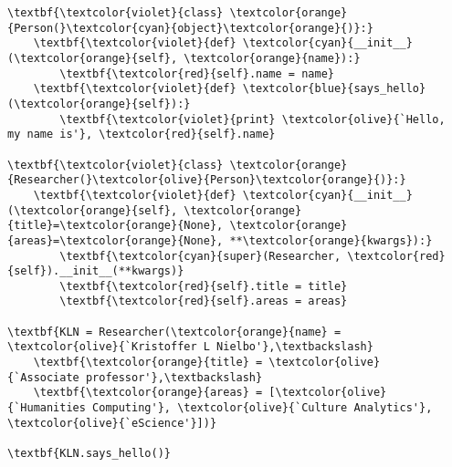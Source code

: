 \begin{frame}[fragile]

\begin{columns}
\begin{column}{0.74\textwidth}
\begin{Verbatim}
\textbf{\textcolor{violet}{class} \textcolor{orange}{Person(}\textcolor{cyan}{object}\textcolor{orange}{)}:}
    \textbf{\textcolor{violet}{def} \textcolor{cyan}{__init__}(\textcolor{orange}{self}, \textcolor{orange}{name}):}
        \textbf{\textcolor{red}{self}.name = name}
    \textbf{\textcolor{violet}{def} \textcolor{blue}{says_hello}(\textcolor{orange}{self}):}
        \textbf{\textcolor{violet}{print} \textcolor{olive}{`Hello, my name is'}, \textcolor{red}{self}.name}

\textbf{\textcolor{violet}{class} \textcolor{orange}{Researcher(}\textcolor{olive}{Person}\textcolor{orange}{)}:}
    \textbf{\textcolor{violet}{def} \textcolor{cyan}{__init__}(\textcolor{orange}{self}, \textcolor{orange}{title}=\textcolor{orange}{None}, \textcolor{orange}{areas}=\textcolor{orange}{None}, **\textcolor{orange}{kwargs}):}
        \textbf{\textcolor{cyan}{super}(Researcher, \textcolor{red}{self}).__init__(**kwargs)}
        \textbf{\textcolor{red}{self}.title = title}
        \textbf{\textcolor{red}{self}.areas = areas}

\textbf{KLN = Researcher(\textcolor{orange}{name} = \textcolor{olive}{`Kristoffer L Nielbo'},\textbackslash}
	\textbf{\textcolor{orange}{title} = \textcolor{olive}{`Associate professor'},\textbackslash}
	\textbf{\textcolor{orange}{areas} = [\textcolor{olive}{`Humanities Computing'}, \textcolor{olive}{`Culture Analytics'}, \textcolor{olive}{`eScience'}])}

\textbf{KLN.says_hello()}
\end{Verbatim}
\end{column}
	\begin{column}{0.3\textwidth}
	
    		\begin{center}
    			\\
    		\end{center}
    		\medskip
    		\smallskip
	\end{column}
\end{columns}
\end{frame}
